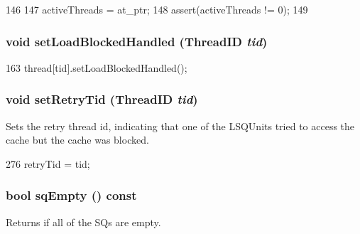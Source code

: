 \begin{DoxyCode}
146 {
147     activeThreads = at_ptr;
148     assert(activeThreads != 0);
149 }
\end{DoxyCode}
\hypertarget{classLSQ_a30c462e914644ddba59b0d769941b5dd}{
\subsubsection[{setLoadBlockedHandled}]{\setlength{\rightskip}{0pt plus 5cm}void setLoadBlockedHandled ({\bf ThreadID} {\em tid})}}
\label{classLSQ_a30c462e914644ddba59b0d769941b5dd}



\begin{DoxyCode}
163     { thread[tid].setLoadBlockedHandled(); }
\end{DoxyCode}
\hypertarget{classLSQ_aca00d390ba2ada0daf6e0c0a7cf75f57}{
\subsubsection[{setRetryTid}]{\setlength{\rightskip}{0pt plus 5cm}void setRetryTid ({\bf ThreadID} {\em tid})}}
\label{classLSQ_aca00d390ba2ada0daf6e0c0a7cf75f57}
Sets the retry thread id, indicating that one of the LSQUnits tried to access the cache but the cache was blocked. 


\begin{DoxyCode}
276     { retryTid = tid; }
\end{DoxyCode}
\hypertarget{classLSQ_a5761e9640bec8ba8474945cce57b6501}{
\subsubsection[{sqEmpty}]{\setlength{\rightskip}{0pt plus 5cm}bool sqEmpty () const}}
\label{classLSQ_a5761e9640bec8ba8474945cce57b6501}
Returns if all of the SQs are empty. 


